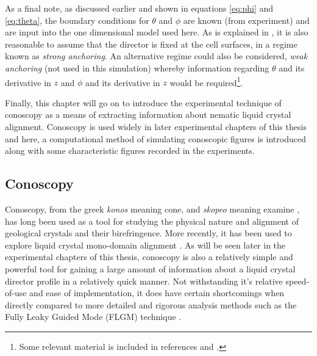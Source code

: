 % 
% 
% 

\noindent As a final note, as discussed earlier and shown in equations \ref{eq:phi} and \ref{eq:theta}, the boundary conditions for $\theta$ and $\phi$ are known (from experiment) and are input into the one dimensional model used here. As is explained in \cite{Cornford2008}, it is also reasonable to assume that the director is fixed at the cell surfaces, in a regime known as \textit{strong anchoring}. An alternative regime could also be considered, \textit{weak anchoring} (not used in this simulation) whereby information regarding $\theta$ and its derivative in $z$ and $\phi$ and its derivative in $z$ would be required\footnote{Some relevant material is included in references \cite{Cui2006} and \cite{Choate2008}.}.

Finally, this chapter will go on to introduce the experimental technique of conoscopy as a means of extracting information about nematic liquid crystal alignment. Conoscopy is used widely in later experimental chapters of this thesis and here, a computational method of simulating conoscopic figures is introduced along with some characteristic figures recorded in the experiments.

\newpage
\subsection{Conoscopy}
Conoscopy, from the greek \textit{konos} meaning cone, and \textit{skopeo} meaning examine \cite{wikipedia}, has long been used as a tool for studying the physical nature and alignment of geological crystals and their birefringence. More recently, it has been used to explore liquid crystal mono-domain alignment \cite{Horn2001}. As will be seen later in the experimental chapters of this thesis, conoscopy is also a relatively simple and powerful tool for gaining a large amount of information about a liquid crystal director profile in a relatively quick manner. Not withstanding it's relative speed-of-use and ease of implementation, it does have certain shortcomings when directly compared to more detailed and rigorous analysis methods such as the Fully Leaky Guided Mode (FLGM) technique \cite{Cornford2009,Yang2007,Jewell2005a,Jewell2006,Jewell2007}.

